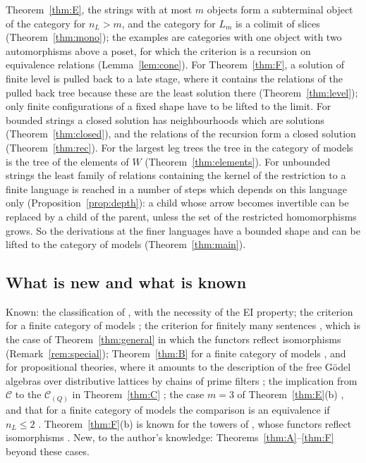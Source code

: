 \documentclass[11pt]{amsart}
\theoremstyle{definition}
\newcommand{\cC}{\mathcal C}
\begin{document}
Theorem~\ref{thm:E}, the strings with at most $m$ objects form a
subterminal object of the category for $n_L>m$, and the category for
$L_m$ is a colimit of slices (Theorem~\ref{thm:mono}); the examples
are categories with one object with two automorphisms above a poset,
for which the criterion is a recursion on equivalence relations
(Lemma~\ref{lem:cone}). For Theorem~\ref{thm:F}, a solution of finite level
is pulled back to a late stage, where it contains the relations of
the pulled back tree because these are the least solution there
(Theorem~\ref{thm:level}); only finite configurations of a fixed
shape have to be lifted to the limit. For bounded strings a closed
solution has neighbourhoods which are solutions
(Theorem~\ref{thm:closed}), and the relations of the recursion form a
closed solution (Theorem~\ref{thm:rec}). For the largest leg trees the
tree in the category of models is the tree of the elements of $W$
(Theorem~\ref{thm:elements}). For unbounded strings the least family
of relations containing the kernel of the restriction to a finite
language is reached in a number of steps which depends on this
language only (Proposition~\ref{prop:depth}): a child whose arrow
becomes invertible can be replaced by a child of the parent, unless
the set of the restricted homomorphisms grows. So the derivations at
the finer languages have a bounded shape and can be lifted to the
category of models (Theorem~\ref{thm:main}).

\subsection*{What is new and what is known}
Known: the classification of \cite{Finsorts}, with the necessity of
the EI property; the criterion for a finite category of models
\cite[Thm.~1.1, Thm.~6.15]{Strings}; the criterion for finitely many
sentences \cite[Thm.~1.1, Thm.~8.2]{Proftrees}, which is the case of
Theorem~\ref{thm:general} in which the functors reflect isomorphisms
(Remark~\ref{rem:special}); Theorem~\ref{thm:B} for a finite category
of models \cite[Prop.~4.2]{Strings}, and for propositional theories,
where it amounts to the description of the free G\"odel algebras over
distributive lattices by chains of prime filters \cite{AGM08,Carai}; the implication from $\cC$ to the
$\cC_{(Q)}$ in Theorem~\ref{thm:C} \cite[Thm.~1.3]{Proftrees}; the
case $m=3$ of Theorem~\ref{thm:E}(b) \cite[Ex.~6.19]{Strings}, and
that for a finite category of models the comparison is an equivalence
if $n_L\le2$ \cite[Cor.~6.3]{Strings}. Theorem~\ref{thm:F}(b) is known for the
towers of \cite{Proftrees}, whose functors reflect isomorphisms
\cite[Prop.~8.3]{Proftrees}. New, to
the author's knowledge: Theorems~\ref{thm:A}--\ref{thm:F} beyond these
cases.
\end{document}
